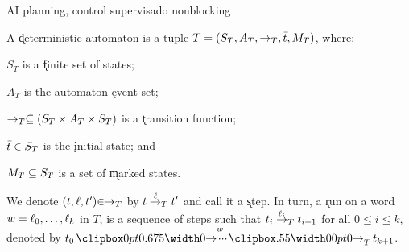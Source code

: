 AI planning, control supervisado
nonblocking


\begin{definition} \label{def:automaton}
	A \k{deterministic automaton} is a tuple $T = (S_T, A_T, \rightarrow_T, \bar{t}, M_T)$, where:
	\begin{itemize*}[label=]
		
		\item $S_T$ is a \k{finite set of states};
		
		\item $A_T$ is the automaton \k{event set};
		
		\item $\rightarrow_T \subseteq (S_T \times A_T \times S_T)$ is a \k{transition function};
		
		\item $\bar{t} \in S_T$ is the \k{initial state}; and
		
		\item $M_T \subseteq S_T$ is a set of \k{marked states}.
		
	\end{itemize*}
	
\end{definition}

\begin{notation} \label{not:step}
	
	$\!\!$We denote $(t,\ell,t') {\in}\!\! \rightarrow_T$ by $t \overset{\ell}{\rightarrow}_{T} t'$ and call it a \k{step}.
	In turn, a \k{run} on a word $w = \ell_0,\ldots,\ell_k$ in $T$, is a sequence of steps such that $t_i \overset{\ell_i}{\rightarrow}_{T} t_{i+1}$ for all $0 \leq i \leq k$, denoted by $t_0 \runw{w}{T} t_{k+1}$.
	
\end{notation}

